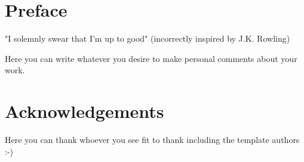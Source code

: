 
\chapter*{Preface}

\begin{center}
    "I solemnly swear that I'm up to good" (incorrectly inspired by J.K. Rowling)
\end{center}

\vspace{2cm}
Here you can write whatever you desire to make personal comments about your
work.


\clearpage
\chapter*{Acknowledgements}

\vspace{2cm}
Here you can thank whoever you see fit to thank including the template authors
:-)

